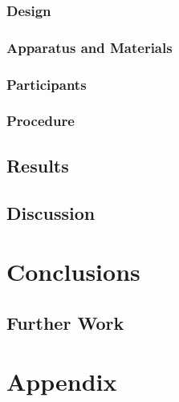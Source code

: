 \documentclass[journal]{IEEEtran}
\begin{document}
\subsubsection{Design}
\subsubsection{Apparatus and Materials}
\subsubsection{Participants}
\subsubsection{Procedure}
\subsection{Results}
\subsection{Discussion}
\section{Conclusions}
\subsection{Further Work}


\section{Appendix}
\end{document}
